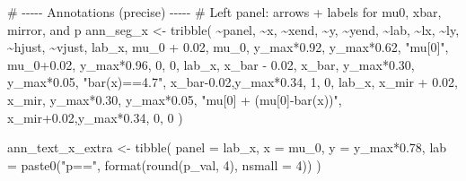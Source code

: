 \documentclass[
  letterpaper,
  DIV=11,
  numbers=noendperiod]{scrreprt}
\newenvironment{Shaded}{\begin{snugshade}}{\end{snugshade}}
\newcommand{\AttributeTok}[1]{\textcolor[rgb]{0.40,0.45,0.13}{#1}}
\newcommand{\CommentTok}[1]{\textcolor[rgb]{0.37,0.37,0.37}{#1}}
\newcommand{\DecValTok}[1]{\textcolor[rgb]{0.68,0.00,0.00}{#1}}
\newcommand{\FloatTok}[1]{\textcolor[rgb]{0.68,0.00,0.00}{#1}}
\newcommand{\FunctionTok}[1]{\textcolor[rgb]{0.28,0.35,0.67}{#1}}
\newcommand{\NormalTok}[1]{\textcolor[rgb]{0.00,0.23,0.31}{#1}}
\newcommand{\OtherTok}[1]{\textcolor[rgb]{0.00,0.23,0.31}{#1}}
\newcommand{\SpecialCharTok}[1]{\textcolor[rgb]{0.37,0.37,0.37}{#1}}
\newcommand{\StringTok}[1]{\textcolor[rgb]{0.13,0.47,0.30}{#1}}
\begin{document}
\begin{Shaded}
\begin{Highlighting}[]
\CommentTok{\# {-}{-}{-}{-}{-} Annotations (precise) {-}{-}{-}{-}{-}}
\CommentTok{\# Left panel: arrows + labels for mu0, xbar, mirror, and p}
\NormalTok{ann\_seg\_x }\OtherTok{\textless{}{-}} \FunctionTok{tribble}\NormalTok{(}
  \SpecialCharTok{\textasciitilde{}}\NormalTok{panel, }\SpecialCharTok{\textasciitilde{}}\NormalTok{x,         }\SpecialCharTok{\textasciitilde{}}\NormalTok{xend,     }\SpecialCharTok{\textasciitilde{}}\NormalTok{y,               }\SpecialCharTok{\textasciitilde{}}\NormalTok{yend,             }\SpecialCharTok{\textasciitilde{}}\NormalTok{lab,                      }\SpecialCharTok{\textasciitilde{}}\NormalTok{lx,       }\SpecialCharTok{\textasciitilde{}}\NormalTok{ly,                 }\SpecialCharTok{\textasciitilde{}}\NormalTok{hjust, }\SpecialCharTok{\textasciitilde{}}\NormalTok{vjust,}
\NormalTok{  lab\_x,  mu\_0 }\SpecialCharTok{+} \FloatTok{0.02}\NormalTok{, mu\_0,     y\_max}\SpecialCharTok{*}\FloatTok{0.92}\NormalTok{,       y\_max}\SpecialCharTok{*}\FloatTok{0.62}\NormalTok{,        }\StringTok{"mu[0]"}\NormalTok{,                  mu\_0}\FloatTok{+0.02}\NormalTok{, y\_max}\SpecialCharTok{*}\FloatTok{0.96}\NormalTok{,          }\DecValTok{0}\NormalTok{,      }\DecValTok{0}\NormalTok{,}
\NormalTok{  lab\_x,  x\_bar }\SpecialCharTok{{-}} \FloatTok{0.02}\NormalTok{, x\_bar,   y\_max}\SpecialCharTok{*}\FloatTok{0.30}\NormalTok{,       y\_max}\SpecialCharTok{*}\FloatTok{0.05}\NormalTok{,        }\StringTok{"bar(x)==4.7"}\NormalTok{,            x\_bar}\FloatTok{{-}0.02}\NormalTok{,y\_max}\SpecialCharTok{*}\FloatTok{0.34}\NormalTok{,          }\DecValTok{1}\NormalTok{,      }\DecValTok{0}\NormalTok{,}
\NormalTok{  lab\_x,  x\_mir }\SpecialCharTok{+} \FloatTok{0.02}\NormalTok{, x\_mir,   y\_max}\SpecialCharTok{*}\FloatTok{0.30}\NormalTok{,       y\_max}\SpecialCharTok{*}\FloatTok{0.05}\NormalTok{,        }\StringTok{"mu[0] + (mu[0]{-}bar(x))"}\NormalTok{, x\_mir}\FloatTok{+0.02}\NormalTok{,y\_max}\SpecialCharTok{*}\FloatTok{0.34}\NormalTok{,          }\DecValTok{0}\NormalTok{,      }\DecValTok{0}
\NormalTok{)}

\NormalTok{ann\_text\_x\_extra }\OtherTok{\textless{}{-}} \FunctionTok{tibble}\NormalTok{(}
  \AttributeTok{panel =}\NormalTok{ lab\_x,}
  \AttributeTok{x =}\NormalTok{ mu\_0, }\AttributeTok{y =}\NormalTok{ y\_max}\SpecialCharTok{*}\FloatTok{0.78}\NormalTok{,}
  \AttributeTok{lab =} \FunctionTok{paste0}\NormalTok{(}\StringTok{"p=="}\NormalTok{, }\FunctionTok{format}\NormalTok{(}\FunctionTok{round}\NormalTok{(p\_val, }\DecValTok{4}\NormalTok{), }\AttributeTok{nsmall =} \DecValTok{4}\NormalTok{))}
\NormalTok{)}


\end{Highlighting}
\end{Shaded}
\end{document}
